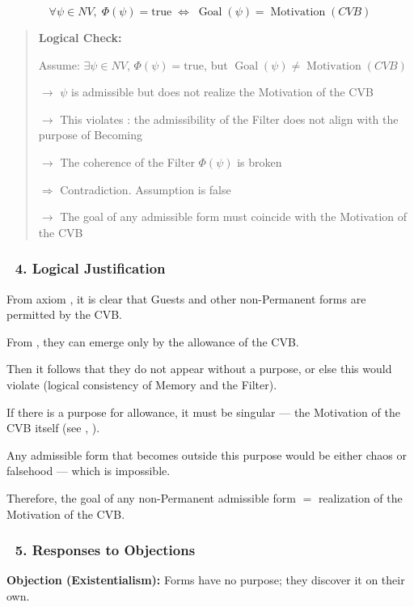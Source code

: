 \documentclass[12pt]{article}
\begin{document}
\[
\forall \psi \in NV, \; \Phi(\psi) = \text{true} \;\Leftrightarrow\; \operatorname{Goal}(\psi) = \operatorname{Motivation}(CVB)
\]

\begin{quote}
\textbf{Logical Check:}

Assume: $\exists \psi \in NV$, $\Phi(\psi) = \text{true}$, but $\operatorname{Goal}(\psi) \neq \operatorname{Motivation}(CVB)$

$\rightarrow$ $\psi$ is admissible but does not realize the Motivation of the CVB

$\rightarrow$ This violates \text{[11.1.1]}: the admissibility of the Filter does not align with the purpose of Becoming

$\rightarrow$ The coherence of the Filter $\Phi(\psi)$ is broken

$\Rightarrow$ Contradiction. Assumption is false

$\rightarrow$ The goal of any admissible form must coincide with the Motivation of the CVB
\end{quote}

\subsubsection*{🔹 4. Logical Justification}

From axiom \text{[15.3]}, it is clear that Guests and other non-Permanent forms are permitted by the CVB.

From \text{[16]}, they can emerge only by the allowance of the CVB.

Then it follows that they do not appear without a purpose, or else this would violate \text{[10.3.6]} (logical consistency of Memory and the Filter).

If there is a purpose for allowance, it must be singular — the Motivation of the CVB itself (see \text{[14]}, \text{[10.2.3]}).

Any admissible form that becomes outside this purpose would be either chaos or falsehood — which is impossible.

Therefore, the goal of any non-Permanent admissible form $=$ realization of the Motivation of the CVB.

\subsubsection*{🔹 5. Responses to Objections}

\textbf{Objection (Existentialism):} Forms have no purpose; they discover it on their own.
\end{document}
